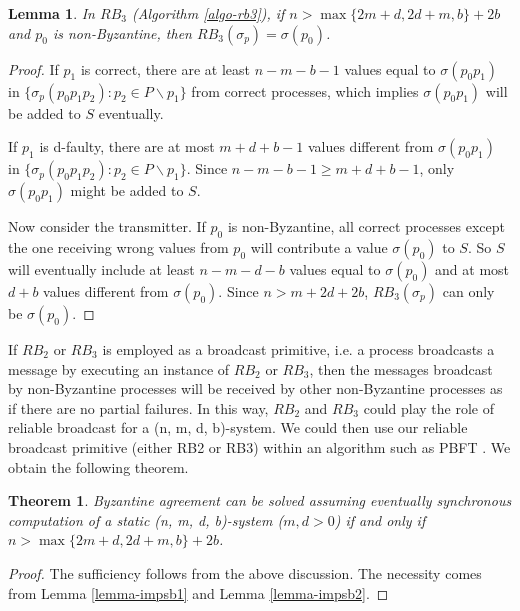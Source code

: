 \documentclass[11pt,conference,compsoc,onecolumn,romanappendices]{IEEEtran}
\newtheorem{lemma}{Lemma}
\newtheorem{theorem}{Theorem}
\begin{document}
\begin{lemma}
  In $R B_3$ (Algorithm \ref{algo-rb3}), if $n > \max \{ 2 m + d, 2 d + m, b \} + 2 b$
  and $p_0$ is non-Byzantine, then $R B_3 (\sigma_p) = \sigma (p_0)$.
\end{lemma}

\begin{proof}
  If $p_1$ is correct, there are at least $n - m - b
  - 1$ values equal to $\sigma (p_0 p_1)$ in $\{ \sigma_p (p_0 p_1 p_2)
  : {p_2 \in P \backslash p_1} \}$ from correct processes, which implies
  $\sigma (p_0 p_1)$ will be added to $S$ eventually.
  
  If $p_1$ is d-faulty, there are at most $m + d + b -
  1$ values different from $\sigma (p_0 p_1)$ in $\{ \sigma_p (p_0 p_1 p_2)
  : {p_2 \in P \backslash p_1} \}$. Since $n - m - b - 1 \geqslant m + d + b - 1$, only
  $\sigma (p_0 p_1)$ might be added to $S$.
  
  Now consider the transmitter.
  If $p_0$ is non-Byzantine, all correct processes
  except the one receiving wrong values from $p_0$ will contribute a value
  $\sigma (p_0)$ to $S$. So $S$ will eventually include at least $n - m - d - b$
  values equal to $\sigma (p_0)$ and at most $d + b$ values different from
  $\sigma (p_0)$. Since $n > m + 2 d + 2 b$, $R B_3 (\sigma_p)$ can only be
  $\sigma (p_0)$.
\end{proof}

If $R B_2$ or $R B_3$ is employed as a broadcast primitive, i.e. a
process broadcasts a message by executing an instance of $R B_2$ or
$R B_3$, then the messages broadcast by non-Byzantine processes will be
received by other non-Byzantine processes as if there are no partial failures. In
this way, $R B_2$ and $R B_3$ could play the role of reliable
broadcast for a (n, m, d, b)-system. We could then use our reliable broadcast
primitive (either RB2 or RB3) within an algorithm such as PBFT \cite{castro1999practical}.
We obtain the following theorem.

\begin{theorem}
  Byzantine agreement can be solved assuming eventually synchronous computation of a static (n, m, d,
  b)-system ($m, d > 0$) if and only if $n > \max \{2 m + d, 2 d + m, b\}+ 2
  b$.
\end{theorem}

\begin{proof}   
  The sufficiency follows from the above discussion. The
  necessity comes from Lemma \ref{lemma-impsb1} and Lemma \ref{lemma-impsb2}.
\end{proof}
\end{document}

